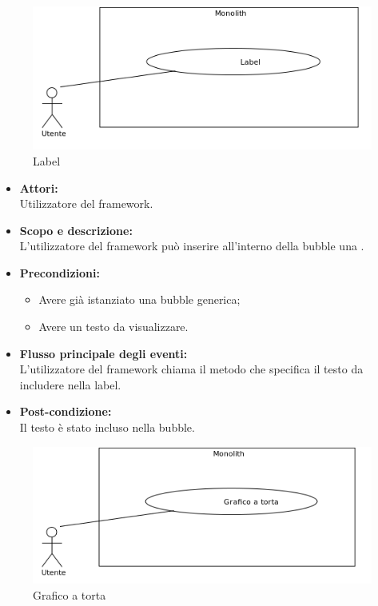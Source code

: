 
\begin{figure}[H]
	\centering
	\includegraphics[width=15cm]{../../documenti/AnalisiDeiRequisiti/Diagrammi_img/uc1_27.png}
	\caption{\UCFCaption{} Label}
\end{figure}

\begin{itemize}
	\item \textbf{Attori:}
	\\Utilizzatore del framework.
	\item \textbf{Scopo e descrizione:} 
	\\L'utilizzatore del framework può inserire all'interno della bubble una .
	\item \textbf{Precondizioni:}
	\begin{itemize}
		\item Avere già istanziato una bubble generica;
		\item Avere un testo da visualizzare.
	\end{itemize}
	\item \textbf{Flusso principale degli eventi:}
	\\L'utilizzatore del framework chiama il metodo che specifica il testo da includere nella label.
	\item \textbf{Post-condizione:}
	\\Il testo è stato incluso nella bubble.
\end{itemize}


\begin{figure}[H]
	\centering
	\includegraphics[width=15cm]{../../documenti/AnalisiDeiRequisiti/Diagrammi_img/uc1_28.png}
	\caption{\UCFCaption{} Grafico a torta}
\end{figure}

